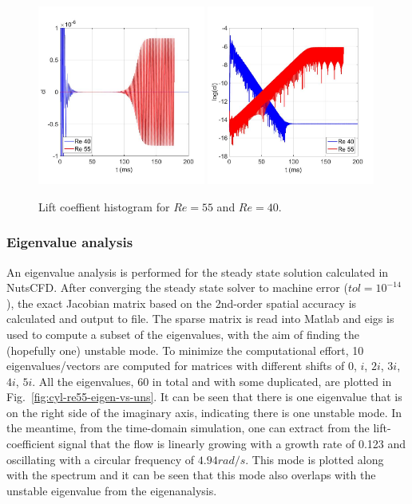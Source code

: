 \documentclass[journal,final]{new-aiaa}
\begin{document}
\begin{figure}[htb]
	\centering   
	\includegraphics[width=0.49\textwidth]{pic/cl-linear.jpg}	\includegraphics[width=0.49\textwidth]{pic/cl-log.jpg}
	\caption{Lift coeffient histogram for $Re=55$ and $Re=40$.}
	\label{fig:cyl-re40-re55-uns}
\end{figure}

\subsubsection{Eigenvalue analysis}
An eigenvalue analysis is performed for the steady state solution calculated
in NutsCFD. After converging the steady state solver to machine error ($tol=10^{-14}$),
the exact Jacobian matrix based on the 2nd-order spatial accuracy is calculated and
output to file. The sparse matrix is read into Matlab and eigs is used to compute
a subset of the eigenvalues, with the aim of finding the (hopefully one) unstable mode.
To minimize the computational effort, 10 eigenvalues/vectors are computed for
matrices with different shifts of $0$, $i$, $2i$, $3i$, $4i$, $5i$. All the eigenvalues,
60 in total and with some duplicated, are plotted in Fig.~\ref{fig:cyl-re55-eigen-vs-uns}.
It can be seen that there is one eigenvalue that is on the right side of the imaginary axis,
indicating there is one unstable mode. In the meantime, from the time-domain simulation,
one can extract from the lift-coefficient signal that the flow is linearly growing with a
growth rate of 0.123 and oscillating with a circular frequency of $4.94 rad/s$. This
mode is plotted along with the spectrum and it can be seen that this mode also overlaps
with the unstable eigenvalue from the eigenanalysis. 
\end{document}
